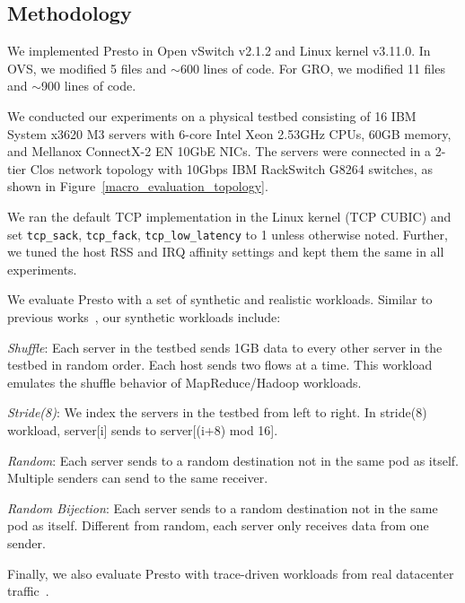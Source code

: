 \subsection{Methodology}
\label{sec:presto-method}

We implemented Presto in Open vSwitch v2.1.2 and Linux kernel v3.11.0.
In OVS, we modified 5 files and $\sim$600 lines of code. For GRO, we modified 11 files and $\sim$900 lines of code.

 We conducted our experiments on a physical
testbed consisting of 16 IBM System x3620 M3 servers with 6-core Intel Xeon
2.53GHz CPUs, 60GB memory, and Mellanox ConnectX-2 EN 10GbE NICs. 
The servers were connected in a 2-tier Clos network topology with 10Gbps
IBM RackSwitch G8264 switches, as shown in Figure~\ref{macro_evaluation_topology}.

We ran the default TCP implementation in the Linux kernel (TCP CUBIC)
and set {\tt tcp\_sack}, {\tt tcp\_fack}, {\tt tcp\_low\_latency} to 1 unless otherwise noted. 
Further, we tuned the host RSS and IRQ affinity settings and kept them the same in all experiments.

We evaluate Presto with a set of synthetic and realistic workloads. 
Similar to previous works~\cite{al2010hedera,rasley2014planck}, 
our synthetic workloads include:

{\em Shuffle}: Each server in the testbed sends 1GB data to every other server in the testbed in random order. 
Each host sends two flows at a time. %
This workload emulates the shuffle behavior of MapReduce/Hadoop workloads.

{\em Stride(8)}: We index the servers in the testbed from left to right. In stride(8) workload, server[i] sends to server[(i+8) mod 16].

{\em Random}: Each server sends to a random destination 
 not in the same pod as itself. Multiple senders can send to the same receiver.

{\em Random Bijection}: Each server sends to a random destination not in the same pod as itself. 
Different from random, each server only receives data from one sender.
 
Finally, we also evaluate Presto with trace-driven workloads from real datacenter traffic~\cite{kandula2009nature}.

